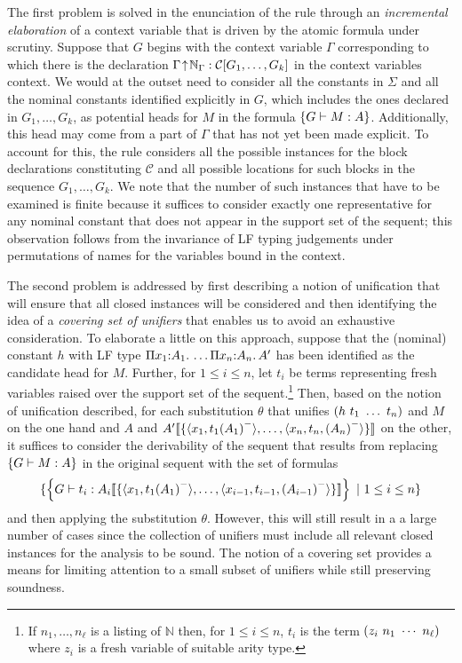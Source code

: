 The first problem is solved in the enunciation of the rule through an
\emph{incremental elaboration} of a context variable that is driven by
the atomic formula under scrutiny.
%
Suppose that $G$ begins with the context variable $\Gamma$
corresponding to which there is the declaration
$\ctxvarty{\Gamma}{\mathbb{N}_{\Gamma}}{\ctxty{\mathcal{C}}{G_1,\ldots,G_k}}$
in the context variables context.
%
We would at the outset need to consider all the constants in $\Sigma$
and all the nominal constants identified explicitly in $G$, which
includes the ones declared in $G_1,\ldots,G_k$, as potential heads for
$M$ in the formula $\fatm{G}{M:A}$.
%
Additionally, this head may come from a part of $\Gamma$ that has not
yet been made explicit.
%
To account for this, the rule considers all the possible instances for
the block declarations constituting $\mathcal{C}$ and all possible
locations for such blocks in the sequence $G_1,\ldots,G_k$.
%
We note that the number of such instances that have to be examined 
is finite because it suffices to consider exactly one representative
for any nominal constant that does not appear in the support set of
the sequent; this observation follows from the invariance of LF typing
judgements under permutations of names for the variables bound in the
context. 

The second problem is addressed by first describing a notion
of unification that will ensure that all closed instances will be
considered and then identifying the idea of a \emph{covering set of
unifiers} that enables us to avoid an exhaustive consideration.
%
To elaborate a little on this approach, suppose that the (nominal)
constant $h$ with LF type
$\typedpi{x_1}{A_1}{\ldots\typedpi{x_n}{A_n}{A'}}$ has been identified 
as the candidate head for $M$.
%
Further, for $1\leq i \leq n$, let $t_i$ be terms representing fresh
variables raised over the support set of the sequent.\footnote{If
  $n_1,\ldots,n_{\ell}$ is a listing of $\mathbb{N}$ then, for $1 \leq
  i \leq n$, $t_i$ is the term $(z_i\app n_1\app \cdots\app n_{\ell})$
  where $z_i$ is a fresh variable of suitable arity type.}
%
Then, based on the notion of unification described, for each
substitution $\theta$ that unifies 
$(h\app t_1\app\ldots\app t_n)$ and $M$ on the one hand and $A$ and
$\hsubst{\{\langle x_1,t_1\erase{A_1} \rangle,
  \ldots,\langle x_n,t_n,\erase{A_n}\rangle\}}{A'}$ on the other, 
it suffices to consider the derivability of the sequent that results
from replacing $\fatm{G}{M:A}$ in the original sequent with the set of
formulas 
\[
  \{\fatm{G}{t_i : \hsubst{\{\langle x_1,t_1\erase{A_1} \rangle,
  \ldots,\langle
  x_{i-1},t_{i-1},\erase{A_{i-1}}\rangle\}}{A_i}}\ \vert\ 1 \leq i \leq
  n\}
\]
and then applying the substitution $\theta$.
%
However, this will still result in a a large number of cases since the
collection of unifiers must include all relevant closed instances for
the analysis to be sound.
%
The notion of a covering set provides a means for limiting attention
to a small subset of unifiers while still preserving soundness.

